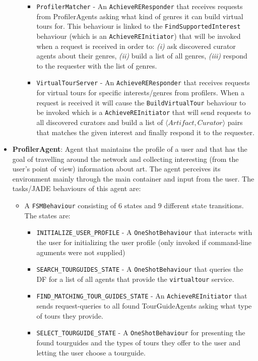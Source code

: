 \documentclass[a4paper, 11pt]{article}
\begin{document}
\begin{itemize}
\begin{itemize}
\begin{itemize}
\item \texttt{ProfilerMatcher} - An \texttt{AchieveREResponder} that receives requests from ProfilerAgents asking what kind of genres it can build virtual tours for. This behaviour is linked to the \texttt{FindSupportedInterest} behaviour (which is an \texttt{AchieveREInitiator}) that will be invoked when a request is received in order to: \textit{(i)} ask discovered curator agents about their genres, \textit{(ii)} build a list of all genres, \textit{(iii)} respond to the requester with the list of genres.
\item \texttt{VirtualTourServer} - An \texttt{AchieveREResponder} that receives requests for virtual tours for specific interests/genres from profilers. When a request is received it will cause the \texttt{BuildVirtualTour} behaviour to be invoked which is a \texttt{AchieveREInitiator} that will send requests to all discovered curators and build a list of $\langle Artifact, Curator\rangle$ pairs that matches the given interest and finally respond it to the requester.
\end{itemize}
\end{itemize}
\item \textbf{ProfilerAgent}: Agent that maintains the profile of a user and that has the goal of travelling around the network and collecting interesting (from the user's point of view) information about art. The agent perceives its environment mainly through the main container and input from the user. The tasks/JADE behaviours of this agent are:
\begin{itemize}
\item A \texttt{FSMBehaviour} consisting of $6$ states and $9$ different state transitions. The states are:
\begin{itemize}
\item \texttt{INITIALIZE\_USER\_PROFILE} - A \texttt{OneShotBehaviour} that interacts with the user for initializing the user profile (only invoked if command-line aguments were not supplied)
\item \texttt{SEARCH\_TOURGUIDES\_STATE} - A \texttt{OneShotBehaviour} that queries the DF for a list of all agents that provide the \texttt{virtualtour} service.
\item \texttt{FIND\_MATCHING\_TOUR\_GUIDES\_STATE} - An \texttt{AchieveREInitiator} that sends request-queries to all found TourGuideAgents asking what type of tours they provide.
\item \texttt{SELECT\_TOURGUIDE\_STATE} - A \texttt{OneShotBehaviour} for presenting the found tourguides and the types of tours they offer to the user and letting the user choose a tourguide.

\end{itemize}
\end{itemize}
\end{itemize}
\end{document}
